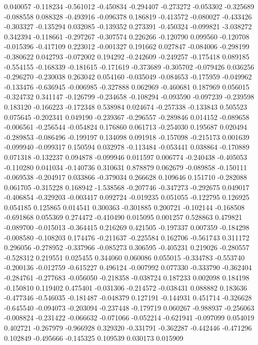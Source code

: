 0.040057
-0.118234
-0.561012
-0.450834
-0.294407
-0.273272
-0.053302
-0.325689
-0.088558
0.088328
-0.493916
-0.096378
0.186819
-0.413572
-0.080027
-0.433426
-0.303327
-0.135294
0.032085
-0.139352
0.273391
-0.450324
-0.099821
-3.038272
0.342394
-0.118661
-0.297267
-0.307574
0.226266
-0.120790
0.099560
-0.120708
-0.015396
-0.417109
0.223012
-0.001327
0.191662
0.027847
-0.084006
-0.298199
-0.380622
0.042793
-0.072002
0.194292
-0.242609
-0.249257
-0.175418
0.089185
-0.554155
-0.168339
-0.181615
-0.171619
-0.373689
-0.305702
-0.079426
0.036256
-0.296270
-0.230038
0.263042
0.054160
-0.035049
-0.084653
-0.175959
-0.049962
-0.133476
-0.636945
-0.006985
-0.327888
0.062969
-0.460681
0.187969
0.056015
-0.324732
0.341147
-0.126799
-0.234658
-0.108294
-0.093590
-0.097239
-0.239598
0.183120
-0.166223
-0.172348
0.538984
0.024674
-0.257338
-0.133843
0.505523
0.075645
-0.202341
0.049190
-0.239367
-0.296557
-0.289846
0.014152
-0.089658
-0.006561
-0.256544
-0.054824
0.176860
0.061713
-0.254030
0.195687
0.020494
-0.289853
-0.086496
-0.199197
0.134098
0.091918
-0.157098
-0.215173
0.001639
-0.099940
-0.099317
0.150594
0.032978
-0.113484
-0.053441
0.038864
-0.170889
0.071318
-0.132237
0.094878
-0.099946
0.011597
0.006774
-0.240438
-0.405053
-0.110280
0.041034
-0.140736
0.310631
0.878879
0.062679
-0.089858
-0.150111
-0.069538
-0.204917
0.033866
-0.379034
0.266628
0.109646
0.151710
-0.282088
0.061705
-0.315228
0.168942
-1.538568
-0.207746
-0.347273
-0.292675
0.049017
-0.406854
-0.329203
-0.003417
0.092724
-0.019235
0.051055
-0.122795
0.126925
0.054185
0.125865
0.014541
0.300363
-0.301885
0.200721
-0.102144
-0.168508
-0.691868
0.055369
0.274472
-0.410490
0.015095
0.001257
0.528863
0.479821
-0.089700
-0.015013
-0.364415
0.216269
0.421505
-0.197337
0.007359
-0.184298
-0.008580
-0.108203
0.174476
-0.211637
-0.225584
0.162706
-0.561743
0.311172
0.296056
-0.278952
-0.337966
-0.085273
0.306595
-0.405231
0.219026
-0.280557
-0.528312
0.219551
0.025455
0.344060
0.060086
0.055015
-0.334783
-0.553740
-0.200136
-0.012759
-0.615227
0.496124
-0.007992
0.077330
-0.333790
-0.362404
-0.284761
-0.277683
-0.056050
-0.218358
-0.038724
0.187233
0.002098
0.184198
-0.150810
0.119402
0.475401
-0.031306
-0.214572
-0.038431
0.088882
0.183636
-0.477346
-0.546035
-0.181487
-0.048379
0.127191
-0.144931
0.451714
-0.326628
-0.645540
-0.094073
-0.203094
-0.237448
-0.179719
0.060267
-0.988937
-0.256063
-0.008824
-0.231422
-0.066632
-0.071066
-0.052214
-0.621941
-0.097099
0.054019
0.402721
-0.267979
-0.966928
0.329320
-0.331791
-0.362287
-0.442446
-0.471296
0.102849
-0.495666
-0.145325
0.109539
0.030173
0.015909
